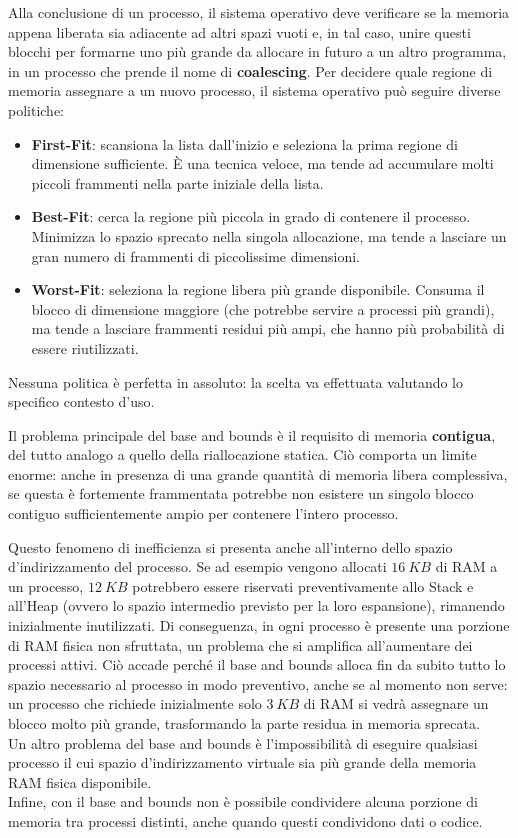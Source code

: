 \documentclass[11pt, a4paper, titlepage, oneside]{scrbook}
\begin{document}
Alla conclusione di un processo, il sistema operativo deve verificare se la memoria appena liberata sia adiacente ad altri spazi vuoti e, in tal caso, unire questi blocchi per formarne uno più grande da allocare in futuro a un altro programma, in un processo che prende il nome di \textbf{coalescing}. Per decidere quale regione di memoria assegnare a un nuovo processo, il sistema operativo può seguire diverse politiche:
\begin{itemize}
    \item \textbf{First-Fit}: scansiona la lista dall'inizio e seleziona la prima regione di dimensione sufficiente. È una tecnica veloce, ma tende ad accumulare molti piccoli frammenti nella parte iniziale della lista.
    \item \textbf{Best-Fit}: cerca la regione più piccola in grado di contenere il processo. Minimizza lo spazio sprecato nella singola allocazione, ma tende a lasciare un gran numero di frammenti di piccolissime dimensioni.
    \item \textbf{Worst-Fit}: seleziona la regione libera più grande disponibile. Consuma il blocco di dimensione maggiore (che potrebbe servire a processi più grandi), ma tende a lasciare frammenti residui più ampi, che hanno più probabilità di essere riutilizzati.
\end{itemize}

Nessuna politica è perfetta in assoluto: la scelta va effettuata valutando lo specifico contesto d'uso.

Il problema principale del base and bounds è il requisito di memoria \textbf{contigua}, del tutto analogo a quello della riallocazione statica. Ciò comporta un limite enorme: anche in presenza di una grande quantità di memoria libera complessiva, se questa è fortemente frammentata potrebbe non esistere un singolo blocco contiguo sufficientemente ampio per contenere l'intero processo.

Questo fenomeno di inefficienza si presenta anche all'interno dello spazio d'indirizzamento del processo. Se ad esempio vengono allocati $\SI{16}{KB}$ di RAM a un processo, $\SI{12}{KB}$ potrebbero essere riservati preventivamente allo Stack e all'Heap (ovvero lo spazio intermedio previsto per la loro espansione), rimanendo inizialmente inutilizzati. Di conseguenza, in ogni processo è presente una porzione di RAM fisica non sfruttata, un problema che si amplifica all'aumentare dei processi attivi. Ciò accade perché il base and bounds alloca fin da subito tutto lo spazio necessario al processo in modo preventivo, anche se al momento non serve: un processo che richiede inizialmente solo $\SI{3}{KB}$ di RAM si vedrà assegnare un blocco molto più grande, trasformando la parte residua in memoria sprecata. \\
Un altro problema del base and bounds è l'impossibilità di eseguire qualsiasi processo il cui spazio d'indirizzamento virtuale sia più grande della memoria RAM fisica disponibile. \\
Infine, con il base and bounds non è possibile condividere alcuna porzione di memoria tra processi distinti, anche quando questi condividono dati o codice.
\end{document}
